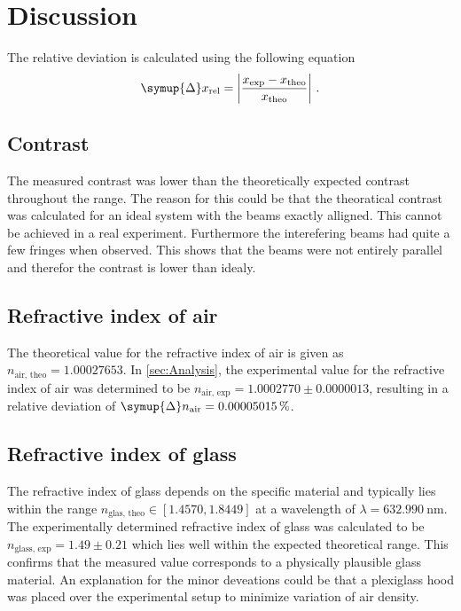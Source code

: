 \section{Discussion}
\label{sec:Discussion}
The relative deviation is calculated using the following equation
\begin{equation*}
    \symup{\Delta} x_{\text{rel}} = \left| \frac{x_{\text{exp}} - x_{{\text{theo}}}}{x_{{\text{theo}}}}\right|\,.
\end{equation*}
\subsection{Contrast}
The measured contrast was lower than the theoretically expected contrast throughout the range. The reason for this could be 
that the theoratical contrast was calculated for an ideal system with the beams exactly alligned. This cannot be achieved in 
a real experiment. Furthermore the interefering beams had quite a few fringes when observed. This shows that the beams 
were not entirely parallel and therefor the contrast is lower than idealy. 

\subsection{Refractive index of air}
The theoretical value for the refractive index of air is given as $n_{\text{air, theo}}=1.00027653$. 
In \autoref{sec:Analysis}, the experimental value for the refractive index of air was determined to be 
$n_{\text{air, exp}} = 1.0002770\pm0.0000013$, resulting in a relative deviation of $\symup{\Delta}n_{\text{air}} = 0.00005015\,\%$. 

\subsection{Refractive index of glass}
The refractive index of 
glass depends on the specific material and typically lies within the range $n_{\text{glas, theo}}\in [1.4570, 1.8449]$ at a 
wavelength of $\lambda = \SI{632.990}{\nano\meter}$. 
The experimentally determined refractive index of glass was calculated to be $n_{\text{glass, exp}} = 1.49\pm0.21$ which lies 
well within the expected theoretical range. 
This confirms that the measured value corresponds to a physically plausible glass material.
An explanation for the minor deveations could be that a plexiglass hood was placed over the experimental setup to minimize 
variation of air density.